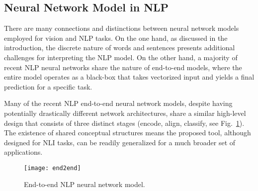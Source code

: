

\subsection{Neural Network Model in NLP}
There are many connections and distinctions between neural network models employed for vision and NLP tasks.
On the one hand, as discussed in the introduction, the discrete nature of words and sentences presents additional challenges for
interpreting the NLP model.
%
On the other hand, a majority of recent NLP neural networks share the nature of
end-to-end models, where the entire model operates as a black-box that takes
vectorized input and yields a final prediction for a specific task.
%

Many of the recent NLP end-to-end neural network models, despite having potentially drastically different network architectures, share a similar high-level design that consists of three distinct stages (encode, align, classify, see Fig.~\ref{fig:modelPipeline}).
%
The existence of shared conceptual structures means the proposed tool, although designed for NLI tasks, can be readily generalized for a much broader set of applications.

\begin{figure}[htbp]
\centering
 \texttt{[image: end2end]}
 \vspace{-2mm}
 \caption{End-to-end NLP neural network model.}
  \vspace{-2mm}
\label{fig:modelPipeline}
\end{figure}


